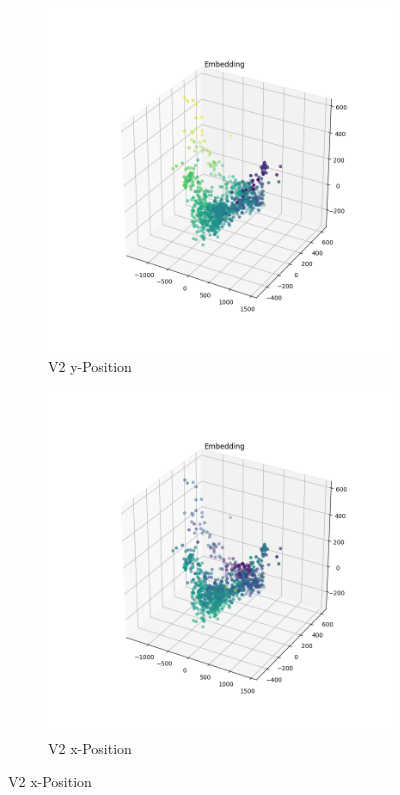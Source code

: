 \begin{figure}[h]
		\begin{subfigure}[c]{0.49\textwidth}			
			\includegraphics[width=1\textwidth,center]{bilder/Hauptteil/MT_Grapple/EMB_alle/2_Embedding_y.png}
			\caption{V2 y-Position}
			\label{img:Einbettung2_y}	
		\end{subfigure}
		\centering
		\begin{subfigure}[c]{0.49\textwidth}			
			\includegraphics[width=1\textwidth,center]{bilder/Hauptteil/MT_Grapple/EMB_alle/2_Embedding_x.png}
			\caption{V2 x-Position}
			\label{img:Einbettung2_x}		
		\end{subfigure}
	

\end{figure}
